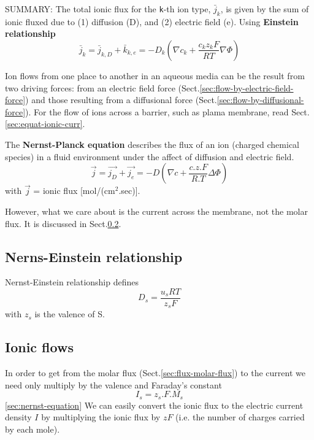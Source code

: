 SUMMARY: The total ionic flux for the \verb!k!-th ion type, $\bar{j}_k$, is
given by the sum of ionic fluxed due to (1) diffusion (D), and (2) electric
field (e).
Using {\bf Einstein relationship}
\begin{equation}
\bar{j}_k = \bar{j}_{k,D} + \bar{k}_{k,e} = -D_k \left( \nabla c_k +
\frac{c_k z_k F}{RT} \nabla \Phi \right)
\end{equation}

\begin{mdframed}
Ion flows from one place to another in an aqueous media can be the result from
two driving forces: from an electric field force
(Sect.\ref{sec:flow-by-electric-field-force}) and those resulting from a
diffusional force (Sect.\ref{sec:flow-by-diffusional-force}). For the flow of
ions across a barrier, such as plama membrane, read
Sect.\ref{sec:equat-ionic-curr}.

The {\bf Nernst-Planck equation} describes the flux of an ion (charged
chemical species) in a fluid environment under the affect of diffusion and
electric field.
\begin{equation}
  \label{eq:1228}
    \overrightarrow{j} = \overrightarrow{j_D} + \overrightarrow{j_e} =
    -D (\nabla c + \frac{c.z.F}{R.T}\Delta \Phi) 
\end{equation}
with $\overrightarrow{j}$ = ionic flux [mol/(cm$^2$.sec)]. 
\end{mdframed}

However, what we care about is the current across the membrane, not the molar
flux. It is discussed in Sect.\ref{sec:ionic-flow}.


\subsection{Nerns-Einstein relationship}
\label{sec:Einstein-relationship}

Nernst-Einstein relationship defines 
\begin{equation}
D_s = \frac{u_s RT}{z_s F}
\end{equation}
with $z_s$ is the valence of S.


\subsection{Ionic flows}
\label{sec:ionic-flow}

In order to get from the molar flux (Sect.\ref{sec:flux-molar-flux}) to the
current we need only multiply by the valence and Faraday's constant
\begin{equation}
I_s = z_s.F.M_s
\end{equation}
\ref{sec:nernst-equation}
We can easily convert the ionic flux to the electric current density $I$ by
multiplying the ionic flux by $zF$ (i.e. the number of charges carried
by each mole).

